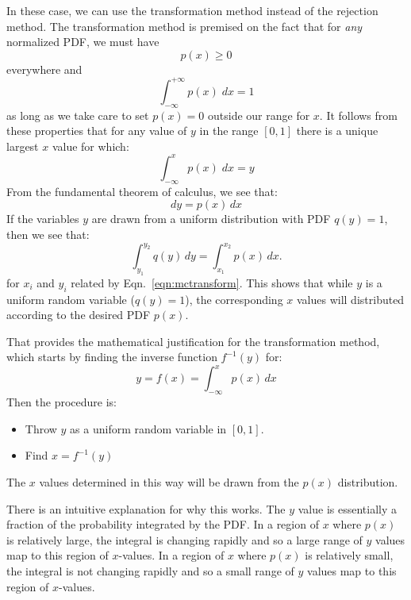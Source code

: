 In these case, we can use the transformation method instead of the
rejection method.  The transformation method is premised on the fact
that for {\em any} normalized PDF, we must have
\begin{displaymath}
  p(x) \geq 0
\end{displaymath}
everywhere and
\begin{displaymath}
  \int_{-\infty}^{+\infty} p(x) \; dx = 1
\end{displaymath}
as long as we take care to set $p(x)=0$ outside our range for $x$.  It follows from these properties that for any value of $y$ in the range $[0,1]$ there is a unique largest $x$ value for which:
\begin{equation} \label{eqn:mctransform}
  \int_{-\infty}^{x} p(x) \; dx = y
\end{equation}
From the fundamental theorem of calculus, we see that:
\begin{displaymath}
  dy = p(x) \, dx
\end{displaymath}
If the variables $y$ are drawn from a uniform distribution with PDF $q(y)=1$, then we see that:
\begin{displaymath}
 \int_{y_1}^{y_2} q(y) \, dy = \int_{x_1}^{x_2}p(x) \, dx.
\end{displaymath}
for $x_i$ and $y_i$ related by Eqn.~\ref{eqn:mctransform}.  This shows
that while $y$ is a uniform random variable ($q(y)=1$), the
corresponding $x$ values will distributed according to the desired PDF
$p(x)$.

That provides the mathematical justification for the transformation
method, which starts by finding the inverse function $f^{-1}(y)$ for:
\begin{displaymath}
  y = f(x) = \int_{-\infty}^{x} p(x) \, dx
\end{displaymath}
Then the procedure is:
\begin{itemize}  
 \item Throw $y$ as a uniform random variable in $[0,1]$.
 \item Find $x = f^{-1}(y)$
\end{itemize}
The $x$ values determined in this way will be drawn from the $p(x)$ distribution.  

There is an intuitive explanation for why this works.  The $y$ value is
essentially a fraction of the probability integrated by the PDF.  In a
region of $x$ where $p(x)$ is relatively large, the integral is
changing rapidly and so a large range of $y$ values map to this region
of $x$-values.  In a region of $x$ where $p(x)$ is relatively small,
the integral is not changing rapidly and so a small range of $y$
values map to this region of $x$-values.

